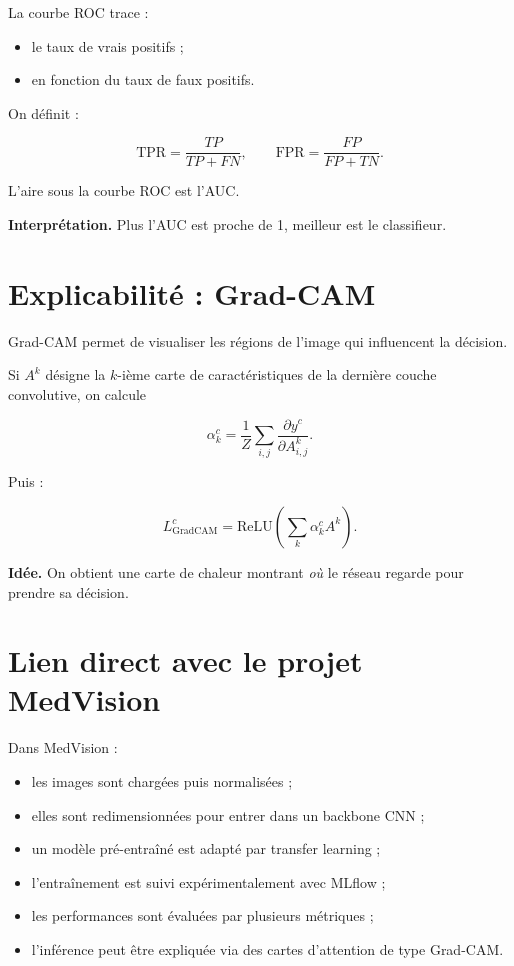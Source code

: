 ﻿\documentclass[11pt,a4paper]{article}
\begin{document}
La courbe ROC trace :
\begin{itemize}
    \item le taux de vrais positifs ;
    \item en fonction du taux de faux positifs.
\end{itemize}

On définit :

\[
\mathrm{TPR}=\frac{TP}{TP+FN},
\qquad
\mathrm{FPR}=\frac{FP}{FP+TN}.
\]

L’aire sous la courbe ROC est l’AUC.

\textbf{Interprétation.}  
Plus l’AUC est proche de 1, meilleur est le classifieur.

\section{Explicabilité : Grad-CAM}

Grad-CAM permet de visualiser les régions de l’image qui influencent la décision.

Si $A^k$ désigne la $k$-ième carte de caractéristiques de la dernière couche convolutive, on calcule

\[
\alpha_k^c
=
\frac{1}{Z}
\sum_{i,j}
\frac{\partial y^c}{\partial A_{i,j}^k}.
\]

Puis :

\[
L_{\mathrm{GradCAM}}^c
=
\mathrm{ReLU}
\left(
\sum_k \alpha_k^c A^k
\right).
\]

\textbf{Idée.}  
On obtient une carte de chaleur montrant \emph{où} le réseau regarde pour prendre sa décision.

\section{Lien direct avec le projet MedVision}

Dans MedVision :
\begin{itemize}
    \item les images sont chargées puis normalisées ;
    \item elles sont redimensionnées pour entrer dans un backbone CNN ;
    \item un modèle pré-entraîné est adapté par transfer learning ;
    \item l’entraînement est suivi expérimentalement avec MLflow ;
    \item les performances sont évaluées par plusieurs métriques ;
    \item l’inférence peut être expliquée via des cartes d’attention de type Grad-CAM.
\end{itemize}
\end{document}
